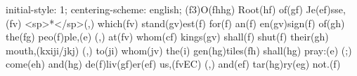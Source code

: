 initial-style: 1;
centering-scheme: english;
(f3)O(fhhg) Root(hf) of(gf) Je(ef)sse,(fv) <sp>*</sp>(,) which(fv) stand(gv)est(f) for(f) an(f) en(gv)sign(f) of(gh) the(fg) peo(f)ple,(e) (,) at(fv) whom(cf) kings(gv) shall(f) shut(f) their(gh) mouth,(kxiji/jkj) (,) to(ji) whom(jv) the(i) gen(hg)tiles(fh) shall(hg) pray:(e) (;) come(eh) and(hg) de(f)liv(gf)er(ef) us,(fvEC) (,) and(ef) tar(hg)ry(eg) not.(f)
